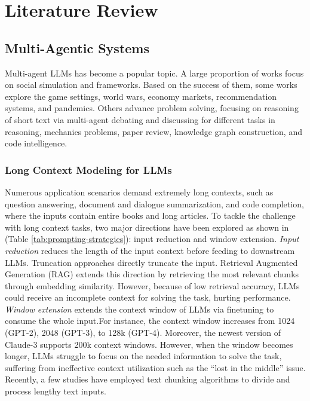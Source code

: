 \chapter{Literature Review}

\section{Multi-Agentic Systems}

 Multi-agent LLMs has become a popular topic. A large proportion of works focus on social simulation and frameworks. Based on the success of them, some
 works explore the game settings, world wars, economy markets, recommendation systems, and pandemics. Others advance problem solving, focusing on reasoning of short text via multi-agent debating and discussing for
 different tasks in reasoning, mechanics problems, paper review, knowledge graph construction, and code intelligence.

\subsection{Long Context Modeling for LLMs} 

Numerous application scenarios demand extremely long contexts, such as question answering, document and dialogue summarization, and code completion, where the inputs contain entire books and long articles. To tackle the challenge with long context tasks, two major directions have been explored as shown in (Table \ref{tab:prompting-strategies}): input reduction and window extension. \textit{Input reduction} reduces the length of the input context before feeding to downstream LLMs. Truncation approaches directly truncate the input. Retrieval Augmented Generation (RAG) extends this direction by retrieving the most relevant chunks through embedding similarity. However, because of low retrieval accuracy, LLMs could receive an incomplete context for solving the task, hurting performance. \textit{Window extension} extends the context window of LLMs via finetuning to consume the whole input.For instance, the context window increases from 1024 (GPT-2), 2048 (GPT-3), to 128k (GPT-4). Moreover, the newest version of Claude-3 supports 200k context windows. However, when the window becomes longer, LLMs struggle to focus on the needed information to solve the task, suffering from ineffective context utilization such as the “lost in the middle” issue. Recently, a few studies have employed text chunking algorithms to divide and process lengthy text inputs.
 
